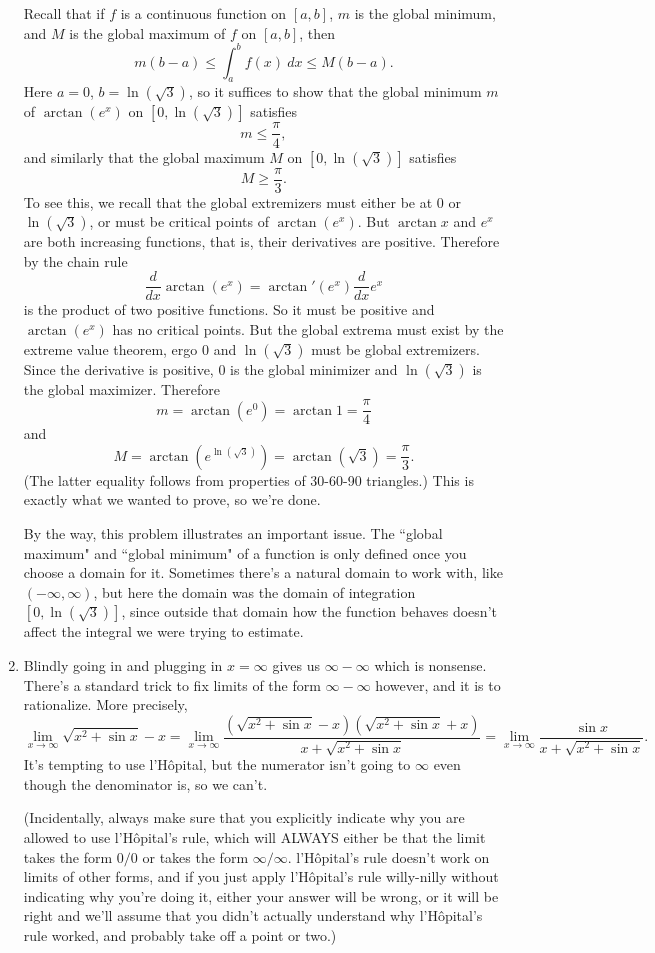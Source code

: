 \documentclass[reqno,12pt,letterpaper]{amsart}
\theoremstyle{definition}
\numberwithin{equation}{section}
\begin{document}
\begin{enumerate}
Recall that if $f$ is a continuous function on $[a, b]$, $m$ is the global minimum, and $M$ is the global maximum of $f$ on $[a, b]$, then
$$m(b - a) \leq \int_a^b f(x) ~dx \leq M(b - a).$$
Here $a = 0$, $b = \ln(\sqrt 3)$, so it suffices to show that the global minimum $m$ of $\arctan(e^x)$ on $[0, \ln(\sqrt 3)]$ satisfies
$$m \leq \frac{\pi}{4},$$
and similarly that the global maximum $M$ on $[0, \ln(\sqrt 3)]$ satisfies
$$M \geq \frac{\pi}{3}.$$
To see this, we recall that the global extremizers must either be at $0$ or $\ln(\sqrt 3)$, or must be critical points of $\arctan(e^x)$.
But $\arctan x$ and $e^x$ are both increasing functions, that is, their derivatives are positive.
Therefore by the chain rule
$$\frac{d}{dx} \arctan(e^x) = \arctan'(e^x) \frac{d}{dx} e^x$$
is the product of two positive functions. So it must be positive and $\arctan(e^x)$ has no critical points.
But the global extrema must exist by the extreme value theorem, ergo $0$ and $\ln(\sqrt 3)$ must be global extremizers.
Since the derivative is positive, $0$ is the global minimizer and $\ln(\sqrt 3)$ is the global maximizer.
Therefore
$$m = \arctan(e^0) = \arctan 1 = \frac{\pi}{4}$$
and
$$M = \arctan(e^{\ln(\sqrt 3)}) = \arctan(\sqrt 3) = \frac{\pi}{3}.$$
(The latter equality follows from properties of 30-60-90 triangles.)
This is exactly what we wanted to prove, so we're done.

By the way, this problem illustrates an important issue.
The ``global maximum" and ``global minimum" of a function is only defined once you choose a domain for it.
Sometimes there's a natural domain to work with, like $(-\infty, \infty)$, but here the domain was the domain of integration $[0, \ln(\sqrt 3)]$, since outside that domain how the function behaves doesn't affect the integral we were trying to estimate.
\item Blindly going in and plugging in $x = \infty$ gives us $\infty - \infty$ which is nonsense.
There's a standard trick to fix limits of the form $\infty - \infty$ however, and it is to rationalize.
More precisely,
$$\lim_{x \to \infty} \sqrt{x^2 + \sin x} - x = \lim_{x \to \infty} \frac{(\sqrt{x^2 + \sin x} - x)(\sqrt{x^2 + \sin x} + x)}{x + \sqrt{x^2 + \sin x}} = \lim_{x \to \infty} \frac{\sin x}{x + \sqrt{x^2 + \sin x}}.$$
It's tempting to use l'H\^opital, but the numerator isn't going to $\infty$ even though the denominator is, so we can't.

(Incidentally, always make sure that you explicitly indicate why you are allowed to use l'H\^opital's rule, which will ALWAYS either be that the limit takes the form $0/0$ or takes the form $\infty/\infty$.
l'H\^opital's rule doesn't work on limits of other forms, and if you just apply l'H\^opital's rule willy-nilly without indicating why you're doing it, either your answer will be wrong, or it will be right and we'll assume that you didn't actually understand why l'H\^opital's rule worked, and probably take off a point or two.)


\end{enumerate}
\end{document}

